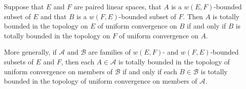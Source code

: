 Suppose that $E$ and $F$ are paired linear spaces, that $A$ is a $w(E,F)$-bounded subset of $E$ and that $B$ is a $w(F,E)$-bounded subset of $F$. Then $A$ is totally bounded in the topology on $E$ of uniform convergence on $B$ if and only if $B$ is totally bounded in the topology on $F$ of uniform convergence on $A$.

More generally, if $\mathcal{A}$ and $\mathcal{B}$ are families of $w(E,F)$- and $w(F,E)$-bounded subsets of $E$ and $F$, then each $A \in \mathcal{A}$ is totally bounded in the topology of uniform convergence on members of $\mathcal{B}$ if and only if each $B \in \mathcal{B}$ is totally bounded in the topology of uniform convergence on members of $\mathcal{A}$.
